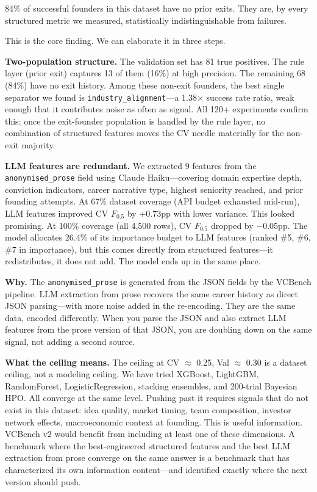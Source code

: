 \documentclass[10pt, conference]{IEEEtran}
\begin{document}
84\% of successful founders in this dataset have no prior exits. They are, by every structured metric we measured, statistically indistinguishable from failures.

This is the core finding. We can elaborate it in three steps.

\textbf{Two-population structure.} The validation set has 81 true positives. The rule layer (prior exit) captures 13 of them (16\%) at high precision. The remaining 68 (84\%) have no exit history. Among these non-exit founders, the best single separator we found is \texttt{industry\_alignment}---a 1.38$\times$ success rate ratio, weak enough that it contributes noise as often as signal. All 120+ experiments confirm this: once the exit-founder population is handled by the rule layer, no combination of structured features moves the CV needle materially for the non-exit majority.

\textbf{LLM features are redundant.} We extracted 9 features from the \texttt{anonymised\_prose} field using Claude Haiku---covering domain expertise depth, conviction indicators, career narrative type, highest seniority reached, and prior founding attempts. At 67\% dataset coverage (API budget exhausted mid-run), LLM features improved CV $F_{0.5}$ by +0.73pp with lower variance. This looked promising. At 100\% coverage (all 4,500 rows), CV $F_{0.5}$ dropped by $-$0.05pp. The model allocates 26.4\% of its importance budget to LLM features (ranked \#5, \#6, \#7 in importance), but this comes directly from structured features---it redistributes, it does not add. The model ends up in the same place.

\textbf{Why.} The \texttt{anonymised\_prose} is generated from the JSON fields by the VCBench pipeline. LLM extraction from prose recovers the same career history as direct JSON parsing---with more noise added in the re-encoding. They are the same data, encoded differently. When you parse the JSON and also extract LLM features from the prose version of that JSON, you are doubling down on the same signal, not adding a second source.

\textbf{What the ceiling means.} The ceiling at CV $\approx$ 0.25, Val $\approx$ 0.30 is a dataset ceiling, not a modeling ceiling. We have tried XGBoost, LightGBM, RandomForest, LogisticRegression, stacking ensembles, and 200-trial Bayesian HPO. All converge at the same level. Pushing past it requires signals that do not exist in this dataset: idea quality, market timing, team composition, investor network effects, macroeconomic context at founding. This is useful information. VCBench v2 would benefit from including at least one of these dimensions. A benchmark where the best-engineered structured features and the best LLM extraction from prose converge on the same answer is a benchmark that has characterized its own information content---and identified exactly where the next version should push.
\end{document}
